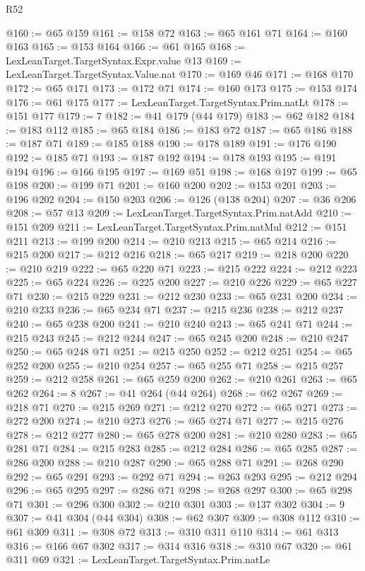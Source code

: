\begin{lexlean}{R52}
\begin{coremodule}
@160 := @65 @159
@161 := @158 @72
@163 := @65 @161 @71
@164 := @160 @163
@165 := @153 @164
@166 := @61 @165
@168 := LexLeanTarget.TargetSyntax.Expr.value @13
@169 := LexLeanTarget.TargetSyntax.Value.nat
@170 := @169 @46
@171 := @168 @170
@172 := @65 @171
@173 := @172 @71
@174 := @160 @173
@175 := @153 @174
@176 := @61 @175
@177 := LexLeanTarget.TargetSyntax.Prim.natLt
@178 := @151 @177
@179 := 7
@182 := @41 @179 (@44 @179)
@183 := @62 @182
@184 := @183 @112
@185 := @65 @184
@186 := @183 @72
@187 := @65 @186
@188 := @187 @71
@189 := @185 @188
@190 := @178 @189
@191 := @176 @190
@192 := @185 @71
@193 := @187 @192
@194 := @178 @193
@195 := @191 @194
@196 := @166 @195
@197 := @169 @51
@198 := @168 @197
@199 := @65 @198
@200 := @199 @71
@201 := @160 @200
@202 := @153 @201
@203 := @196 @202
@204 := @150 @203
@206 := @126 (@138 @204)
@207 := @36 @206
@208 := @57 @13
@209 := LexLeanTarget.TargetSyntax.Prim.natAdd
@210 := @151 @209
@211 := LexLeanTarget.TargetSyntax.Prim.natMul
@212 := @151 @211
@213 := @199 @200
@214 := @210 @213
@215 := @65 @214
@216 := @215 @200
@217 := @212 @216
@218 := @65 @217
@219 := @218 @200
@220 := @210 @219
@222 := @65 @220 @71
@223 := @215 @222
@224 := @212 @223
@225 := @65 @224
@226 := @225 @200
@227 := @210 @226
@229 := @65 @227 @71
@230 := @215 @229
@231 := @212 @230
@233 := @65 @231 @200
@234 := @210 @233
@236 := @65 @234 @71
@237 := @215 @236
@238 := @212 @237
@240 := @65 @238 @200
@241 := @210 @240
@243 := @65 @241 @71
@244 := @215 @243
@245 := @212 @244
@247 := @65 @245 @200
@248 := @210 @247
@250 := @65 @248 @71
@251 := @215 @250
@252 := @212 @251
@254 := @65 @252 @200
@255 := @210 @254
@257 := @65 @255 @71
@258 := @215 @257
@259 := @212 @258
@261 := @65 @259 @200
@262 := @210 @261
@263 := @65 @262
@264 := 8
@267 := @41 @264 (@44 @264)
@268 := @62 @267
@269 := @218 @71
@270 := @215 @269
@271 := @212 @270
@272 := @65 @271
@273 := @272 @200
@274 := @210 @273
@276 := @65 @274 @71
@277 := @215 @276
@278 := @212 @277
@280 := @65 @278 @200
@281 := @210 @280
@283 := @65 @281 @71
@284 := @215 @283
@285 := @212 @284
@286 := @65 @285
@287 := @286 @200
@288 := @210 @287
@290 := @65 @288 @71
@291 := @268 @290
@292 := @65 @291
@293 := @292 @71
@294 := @263 @293
@295 := @212 @294
@296 := @65 @295
@297 := @286 @71
@298 := @268 @297
@300 := @65 @298 @71
@301 := @296 @300
@302 := @210 @301
@303 := @137 @302
@304 := 9
@307 := @41 @304 (@44 @304)
@308 := @62 @307
@309 := @308 @112
@310 := @61 @309
@311 := @308 @72
@313 := @310 @311 @110
@314 := @61 @313
@316 := @166 @67 @302
@317 := @314 @316
@318 := @310 @67
@320 := @61 @311 @69
@321 := LexLeanTarget.TargetSyntax.Prim.natLe

\end{coremodule}
\end{lexlean}
